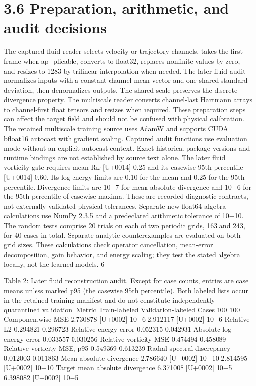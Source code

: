\documentclass[11pt]{article}
\begin{document}
\section*{3.6 Preparation, arithmetic, and audit decisions}

The captured fluid reader selects velocity or trajectory channels, takes the first frame when ap-
plicable, converts to float32, replaces nonfinite values by zero, and resizes to 1283 by trilinear
interpolation when needed. The later fluid audit normalizes inputs with a constant channel-mean
vector and one shared standard deviation, then denormalizes outputs. The shared scale preserves
the discrete divergence property. The multiscale reader converts channel-last Hartmann arrays to
channel-first float tensors and resizes when required. These preparation steps can affect the target
field and should not be confused with physical calibration.
The retained multiscale training source uses AdamW and supports CUDA bfloat16 autocast
with gradient scaling. Captured audit functions use evaluation mode without an explicit autocast
context. Exact historical package versions and runtime bindings are not established by source text
alone.
The later fluid vorticity gate requires mean R\ensuremath{\omega} [U+0014] 0.25 and its casewise 95th percentile [U+0014] 0.60.
Its log-energy limits are 0.10 for the mean and 0.25 for the 95th percentile. Divergence limits are
10\ensuremath{-}7 for mean absolute divergence and 10\ensuremath{-}6 for the 95th percentile of casewise maxima. These are
recorded diagnostic contracts, not externally validated physical tolerances.
Separate new float64 algebra calculations use NumPy 2.3.5 and a predeclared arithmetic tolerance
of 10\ensuremath{-}10. The random tests comprise 20 trials on each of two periodic grids, 163 and 243, for 40 cases
in total. Separate analytic counterexamples are evaluated on both grid sizes. These calculations
check operator cancellation, mean-error decomposition, gain behavior, and energy scaling; they test
the stated algebra locally, not the learned models.
6

Table 2: Later fluid reconstruction audit. Except for case counts, entries are case means unless
marked p95 (the casewise 95th percentile). Both labeled lists occur in the retained training manifest
and do not constitute independently quarantined validation.
Metric Train-labeled Validation-labeled
Cases 100 100
Componentwise MSE 2.730878 [U+0002] 10\ensuremath{-}6 2.912117 [U+0002] 10\ensuremath{-}6
Relative L2 0.294821 0.296723
Relative energy error 0.052315 0.042931
Absolute log-energy error 0.033557 0.030256
Relative vorticity MSE 0.474494 0.458089
Relative vorticity MSE, p95 0.549369 0.613239
Radial spectral discrepancy 0.012003 0.011863
Mean absolute divergence 2.786640 [U+0002] 10\ensuremath{-}10 2.814595 [U+0002] 10\ensuremath{-}10
Target mean absolute divergence 6.371008 [U+0002] 10\ensuremath{-}5 6.398082 [U+0002] 10\ensuremath{-}5
\end{document}
